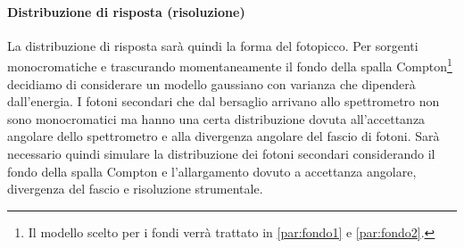  \paragraph{Distribuzione di risposta (risoluzione)}
 La distribuzione di risposta sarà quindi la forma del fotopicco. Per sorgenti monocromatiche e trascurando momentaneamente il fondo della spalla Compton\footnote{Il modello scelto per i fondi verrà trattato in \autoref{par:fondo1} e \autoref{par:fondo2}.} decidiamo di considerare un modello gaussiano con varianza che dipenderà dall'energia.
 I fotoni secondari che dal bersaglio arrivano allo spettrometro non sono monocromatici ma hanno una certa distribuzione dovuta all'accettanza angolare dello spettrometro e alla divergenza angolare del fascio di fotoni. Sarà necessario quindi simulare la distribuzione dei fotoni secondari considerando il fondo della spalla Compton e l'allargamento dovuto a accettanza angolare, divergenza del fascio e risoluzione strumentale.
 
 